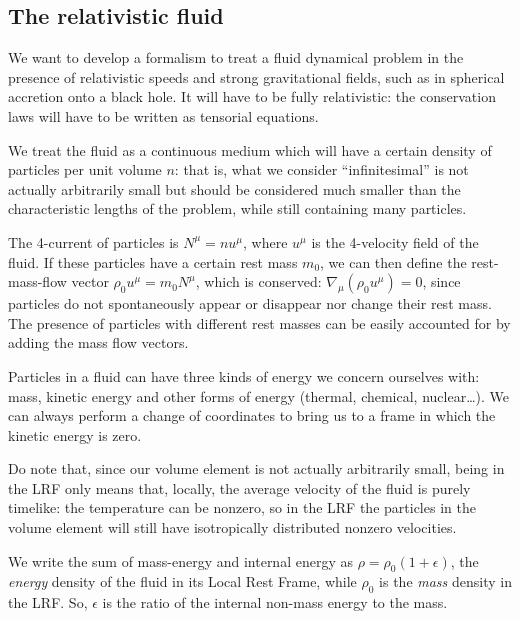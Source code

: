 \documentclass[main.tex]{subfiles}
\begin{document}
\subsection{The relativistic fluid}



We want to develop a formalism to treat a fluid dynamical problem in the presence of relativistic speeds and strong gravitational fields, such as in spherical accretion onto a black hole. It will have to be fully relativistic: the conservation laws will have to be written as tensorial equations.

We treat the fluid as a continuous medium which will have a certain density of particles per unit volume $n$: that is, what we consider ``infinitesimal'' is not actually arbitrarily small but should be considered much smaller than the characteristic lengths of the problem, while still containing many particles.

The 4-current of particles is $N^\mu = n u^\mu$, where \(u^\mu\) is the 4-velocity field of the fluid.
If these particles have a certain rest mass $m_0$, we can then define the rest-mass-flow vector $\rho_0 u^\mu = m_0 N^\mu$, which is conserved: $\nabla_\mu(\rho_0 u^\mu) = 0$, since particles do not spontaneously appear or disappear nor change their rest mass.
The presence of particles with different rest masses can be easily accounted for by adding the mass flow vectors.

Particles in a fluid can have three kinds of energy we concern ourselves with: mass, kinetic energy and other forms of energy (thermal, chemical, nuclear\dots).
We can always perform a change of coordinates to bring us to a frame in which the kinetic energy is zero.

Do note that, since our volume element is not actually arbitrarily small, being in the LRF only means that, locally, the average velocity of the fluid is purely timelike: the temperature can be nonzero, so in the LRF the particles in the volume element will still have isotropically distributed nonzero velocities.

We write the sum of mass-energy and internal energy as $\rho = \rho_0 (1+\epsilon)$, the \emph{energy} density of the fluid in its Local Rest Frame, while \(\rho_0\) is the \emph{mass} density in the LRF.
So, $\epsilon$ is the ratio of the internal non-mass energy to the mass.
\end{document}
